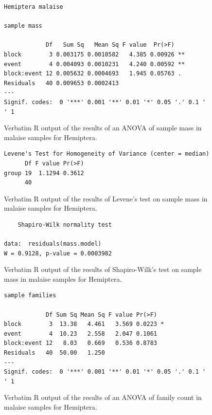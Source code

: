 \documentclass[10pt,letterpaper,twocolumn]{article}
\begin{document}
\begin{figure}[h]
	\lstset{numbers=left}
	\lstset{xleftmargin=5mm,framexleftmargin=5mm}
	\begin{lstlisting}
Hemiptera malaise 

sample mass 

            Df   Sum Sq   Mean Sq F value  Pr(>F)   
block        3 0.003175 0.0010582   4.385 0.00926 **
event        4 0.004093 0.0010231   4.240 0.00592 **
block:event 12 0.005632 0.0004693   1.945 0.05763 . 
Residuals   40 0.009653 0.0002413                   
---
Signif. codes:  0 '***' 0.001 '**' 0.01 '*' 0.05 '.' 0.1 ' ' 1
	\end{lstlisting}
	\caption{Verbatim R output of the results of an ANOVA of sample mass in malaise samples for Hemiptera.}
	\label{fig:malaise_hemiptera_mass_anova}
	\smallskip
	\nointerlineskip
	\hrulefill
\end{figure}

\begin{figure}[h]
	\lstset{numbers=left}
	\lstset{xleftmargin=5mm,framexleftmargin=5mm}
	\begin{lstlisting}
Levene's Test for Homogeneity of Variance (center = median)
      Df F value Pr(>F)
group 19  1.1294 0.3612
      40               
	\end{lstlisting}
	\caption{Verbatim R output of the results of Levene's test on sample mass in malaise samples for Hemiptera.}
	\label{fig:malaise_hemiptera_mass_levene}
	\smallskip
	\nointerlineskip
	\hrulefill
\end{figure}

\begin{figure}[h]
	\lstset{numbers=left}
	\lstset{xleftmargin=5mm,framexleftmargin=5mm}
	\begin{lstlisting}
	Shapiro-Wilk normality test

data:  residuals(mass.model)
W = 0.9128, p-value = 0.0003982
	\end{lstlisting}
	\caption{Verbatim R output of the results of Shapiro-Wilk's test on sample mass in malaise samples for Hemiptera.}
	\label{fig:malaise_hemiptera_mass_shapiro}
	\smallskip
	\nointerlineskip
	\hrulefill
\end{figure}

\begin{figure}[h]
	\lstset{numbers=left}
	\lstset{xleftmargin=5mm,framexleftmargin=5mm}
	\begin{lstlisting}
sample families 

            Df Sum Sq Mean Sq F value Pr(>F)  
block        3  13.38   4.461   3.569 0.0223 *
event        4  10.23   2.558   2.047 0.1061  
block:event 12   8.03   0.669   0.536 0.8783  
Residuals   40  50.00   1.250                 
---
Signif. codes:  0 '***' 0.001 '**' 0.01 '*' 0.05 '.' 0.1 ' ' 1
	\end{lstlisting}
	\caption{Verbatim R output of the results of an ANOVA of family count in malaise samples for Hemiptera.}
	\label{fig:malaise_hemiptera_family_anova}
	\smallskip
	\nointerlineskip
	\hrulefill
\end{figure}
\end{document}

